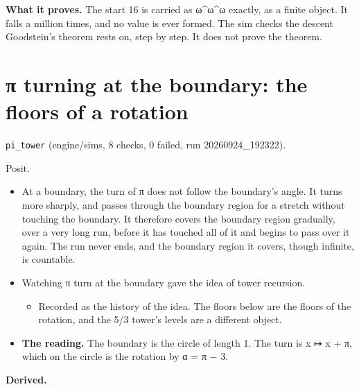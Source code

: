 \textbf{What it proves.} The start 16 is carried as ω\textasciicircum{}ω\textasciicircum{}ω exactly, as a finite object. It falls a million times, and no value is ever formed. The sim checks the descent Goodstein's theorem rests on, step by step. It does not prove the theorem.

\section{\texorpdfstring{π turning at the boundary: the floors of a rotation}{π turning at the boundary: the floors of a rotation}}

\texttt{pi\_\allowbreak{}tower} (engine/sims, 8 checks, 0 failed, run 20260924\_\allowbreak{}192322).

Posit.

\begin{itemize}
\item At a boundary, the turn of π does not follow the boundary's angle. It turns more sharply, and passes through the boundary region for a stretch without touching the boundary. It therefore covers the boundary region gradually, over a very long run, before it has touched all of it and begins to pass over it again. The run never ends, and the boundary region it covers, though infinite, is countable.
\item Watching π turn at the boundary gave the idea of tower recursion.

\begin{itemize}
\item Recorded as the history of the idea. The floors below are the floors of the rotation, and the 5/3 tower's levels are a different object.
\end{itemize}
\item \textbf{The reading.} The boundary is the circle of length 1. The turn is x ↦ x + π, which on the circle is the rotation by α = π − 3.
\end{itemize}

\textbf{Derived.}

